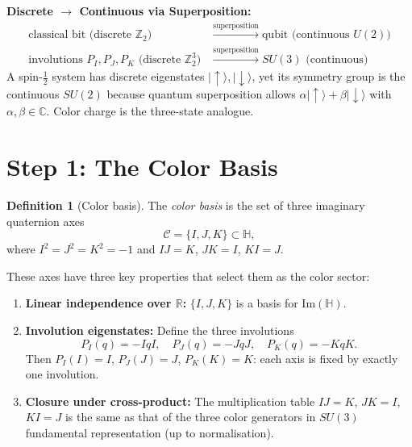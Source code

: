 \documentclass[12pt,a4paper]{article}
\theoremstyle{definition}
\newtheorem{definition}[theorem]{Definition}
\theoremstyle{remark}
\begin{document}
\begin{insightbox}
\textbf{Discrete $\to$ Continuous via Superposition:}
\begin{align*}
  \text{classical bit (discrete } \mathbb{Z}_2\text{)}
    &\xrightarrow{\text{superposition}} \text{qubit (continuous } U(2)\text{)} \\
  \text{involutions } P_I, P_J, P_K \text{ (discrete } \mathbb{Z}_2^3\text{)}
    &\xrightarrow{\text{superposition}} SU(3) \text{ (continuous)}
\end{align*}
A spin-$\tfrac{1}{2}$ system has discrete eigenstates $|\!\uparrow\rangle,
|\!\downarrow\rangle$, yet its symmetry group is the continuous $SU(2)$
because quantum superposition allows $\alpha|\!\uparrow\rangle +
\beta|\!\downarrow\rangle$ with $\alpha,\beta \in \mathbb{C}$.
Color charge is the three-state analogue.
\end{insightbox}

\section{Step 1: The Color Basis}
\label{sec:color_basis}

\begin{definition}[Color basis]
\label{def:color_basis}
The \emph{color basis} is the set of three imaginary quaternion axes
\[
  \mathcal{C} = \{I, J, K\} \subset \mathbb{H},
\]
where $I^2 = J^2 = K^2 = -1$ and $IJ = K$, $JK = I$, $KI = J$.
\end{definition}

These axes have three key properties that select them as the color sector:
\begin{enumerate}
  \item \textbf{Linear independence over $\mathbb{R}$:} $\{I, J, K\}$ is a
        basis for $\mathrm{Im}(\mathbb{H})$.
  \item \textbf{Involution eigenstates:} Define the three involutions
        \[
          P_I(q) = -IqI, \quad P_J(q) = -JqJ, \quad P_K(q) = -KqK.
        \]
        Then $P_I(I) = I$, $P_J(J) = J$, $P_K(K) = K$: each axis is fixed
        by exactly one involution.
  \item \textbf{Closure under cross-product:} The multiplication table
        $IJ = K$, $JK = I$, $KI = J$ is the same as that of the three color
        generators in $SU(3)$ fundamental representation (up to normalisation).
\end{enumerate}
\end{document}

